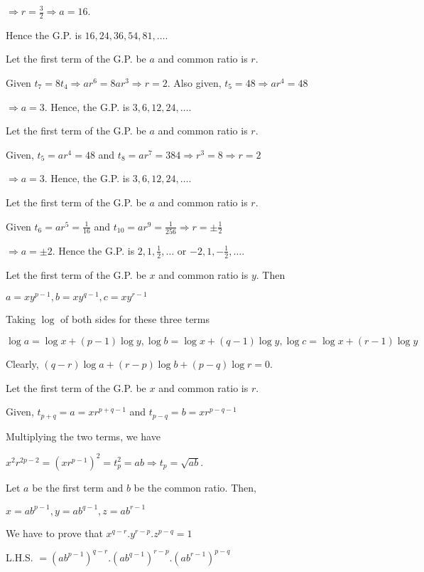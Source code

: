   $\Rightarrow r = \frac{3}{2} \Rightarrow a = 16$.

  Hence the G.P. is $16, 24, 36, 54, 81, \ldots$.
\item Let the first term of the G.P. be $a$ and common ratio is $r$.

  Given $t_7 = 8t_4 \Rightarrow ar^6 = 8ar^3 \Rightarrow r = 2$. Also given, $t_5 = 48 \Rightarrow ar^4 = 48$

  $\Rightarrow a = 3$. Hence, the G.P. is $3, 6, 12, 24, \ldots$.
\item Let the first term of the G.P. be $a$ and common ratio is $r$.

  Given, $t_5 = ar^4 = 48$ and $t_8 = ar^7 = 384 \Rightarrow r^3 = 8 \Rightarrow r = 2$

  $\Rightarrow a = 3$. Hence, the G.P. is $3, 6, 12, 24, \ldots$.
\item Let the first term of the G.P. be $a$ and common ratio is $r$.

  Given $t_6 = ar^5 = \frac{1}{16}$ and $t_{10} = ar^9 = \frac{1}{256} \Rightarrow r = \pm\frac{1}{2}$

  $\Rightarrow a = \pm 2$. Hence the G.P. is $2, 1, \frac{1}{2}, \ldots$ or $-2, 1, -\frac{1}{2}, \ldots$.
\item Let the first term of the G.P. be $x$ and common ratio is $y$. Then

  $a = xy^{p - 1}, b = xy^{q - 1},  c = xy^{r - 1}$

  Taking $\log$ of both sides for these three terms

  $\log a = \log x + (p - 1)\log y, \log b = \log x + (q - 1)\log y, \log c = \log x + (r - 1)\log y$

  Clearly, $(q - r)\log a + (r - p)\log b + (p - q)\log r = 0$.
\item Let the first term of the G.P. be $x$ and common ratio is $r$.

  Given, $t_{p + q} = a = xr^{p + q - 1}$ and $t_{p - q} = b = xr^{p - q - 1}$

  Multiplying the two terms, we have

  $x^2r^{2p - 2} = (xr^{p - 1})^2 = t_p^2 = ab \Rightarrow t_p = \sqrt{ab}$.
\item Let $a$ be the first term and $b$ be the common ratio. Then,

  $x = ab^{p - 1}, y = ab^{q - 1}, z = ab^{r -1}$

  We have to prove that $x^{q - r}.y^{r - p}.z^{p - q} = 1$

  L.H.S. $= (ab^{p - 1})^{q - r}.(ab^{q - 1})^{r - p}.(ab^{r - 1})^{p - q}$

